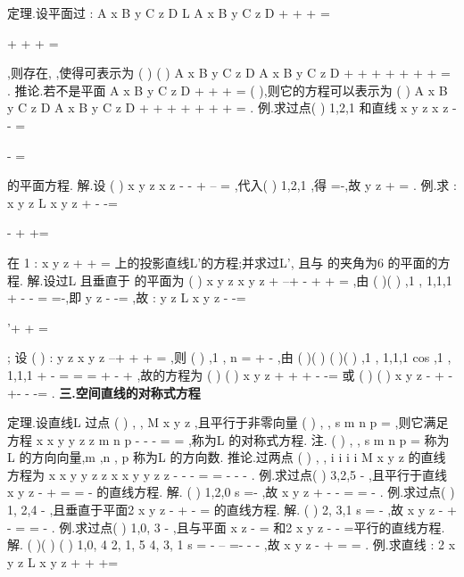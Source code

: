 \textcolor{lyred}{定理}.设平面\Pi 过
:
A x
B y
C z
D
L
A x
B y
C z
D
+
+
+
=


+
+
+
=

,则存在,
\lambda \mu \in {},使得\Pi 可表示为 
(
)
(
)
A x
B y
C z
D
A x
B y
C z
D
\mu 
\lambda 
+
+
+
+
+
+
+
=
. 
\textcolor{lyred}{推论}.若\Pi 不是平面
A x
B y
C z
D
+
+
+
=
(
\mu \neq 
),则它的方程可以表示为 
(
)
A x
B y
C z
D
A x
B y
C z
D
\lambda 
+
+
+
+
+
+
+
=
. 
\textcolor{lyred}{例}.求过点(
)
1,2,1 和直线
x
y
z
x
z
-
-
=

-
=

的平面方程. 
解.设
(
)
x
y
z
x
z
\lambda 
-
-
+
--
=
,代入(
)
1,2,1 ,得
\lambda =-,故
y
z
+
=
. 
\textcolor{lyred}{例}.求
:
x
y
z
L
x
y
z
+
-
-=

-
+
+=

在
1 :
x
y
z
\Pi 
+
+
=
上的投影直线L'的方程;并求过L', 
且与
\Pi 的夹角为6
\pi 的平面\Pi 的方程. 
解.设过L 且垂直于
\Pi 的平面为
(
)
x
y
z
x
y
z
\lambda 
+
--+
-
+
+
=
,由 
(
)(
)
,1
,
1,1,1
\lambda 
\lambda \lambda 
\lambda 
+
-
-
\cdots 
=
\Rightarrow 
=-,即
y
z
-
-=
,故
:
y
z
L
x
y
z
-
-=

'+
+
=

; 
设
(
)
:
y
z
x
y
z
\lambda 
\Pi 
--+
+
+
=
,则
(
)
,1
,
n
\lambda 
\lambda \lambda 
=
+
-
\rho 
,由 
(
)(
)
(
)(
)
,1
,
1,1,1
cos
,1
,
1,1,1
\lambda 
\lambda \lambda 
\lambda 
\pi 
\lambda 
\lambda 
\lambda \lambda 
\lambda 
+
-
\cdots 
=
\Rightarrow 
=
\Rightarrow 
=\pm 
+
-
+
\cdots 
,故\Pi 的方程为 
(
)
(
)
x
y
z
+
+
+
-
-=
或
(
)
(
)
x
y
z
-
+
-
+-
-
-=
. 
\vspace{4pt}
{\bfseries \textcolor{lyred}{三.空间直线的对称式方程}}

\textcolor{lyred}{定理}.设直线L 过点
(
)
,
,
M
x
y z
,且平行于非零向量
(
)
, ,
s
m n p
=
\rho 
,则它满足方程 
x
x
y
y
z
z
m
n
p
-
-
-
=
=
,称为L 的\textcolor{lyred}{对称式方程}. 
\textcolor{lyred}{注}.
(
)
, ,
s
m n p
=
\rho 
称为L 的\textcolor{lyred}{方向向量},m ,n , p 称为L 的\textcolor{lyred}{方向数}. 
\textcolor{lyred}{推论}.过两点
(
)
,
,
i
i
i
i
M
x y z
的直线方程为
x
x
y
y
z
z
x
x
y
y
z
z
-
-
-
=
=
-
-
-
. 
\textcolor{lyred}{例}.求过点(
)
3,2,5
-
,且平行于直线
x
y
z
-
+
=
=
-
的直线方程. 
解.
(
)
1,2,0
s =-
\rho 
,故
x
y
z
+
-
-
=
=
-
. 
\textcolor{lyred}{例}.求过点(
)
1, 2,4
-
,且垂直于平面2
x
y
z
-
+
-
=
的直线方程. 
解.
(
)
2, 3,1
s =
-
\rho 
,故
x
y
z
-
+
-
=
=
-
. 
\textcolor{lyred}{例}.求过点(
)
1,0, 3
-
,且与平面
x
z
-
=
和2
x
y
z
-
-
=平行的直线方程. 
解.
(
)(
)
(
)
1,0, 4
2, 1, 5
4, 3, 1
s =
-
\times 
--
=-
-
-
\rho 
,故
x
y
z
-
+
=
=
. 
\textcolor{lyred}{例}.求直线
: 2
x
y
z
L
x
y
z
+
+
+=


